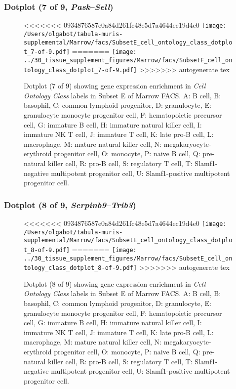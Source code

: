 \clearpage

\subsubsection{Dotplot (7 of 9, \emph{Pask}--\emph{Sell})}
\begin{figure}[h]
\centering
<<<<<<< 0934876587e0a84d261fc48e5d7a4644ec19d4e0
\texttt{[image: /Users/olgabot/tabula-muris-supplemental/Marrow/facs/SubsetE\_cell\_ontology\_class\_dotplot\_7-of-9.pdf]}
=======
\texttt{[image: ../30\_tissue\_supplement\_figures/Marrow/facs/SubsetE\_cell\_ontology\_class\_dotplot\_7-of-9.pdf]}
>>>>>>> autogenerate tex

\caption{ Dotplot (7 of 9)  showing gene expression enrichment in \emph{Cell Ontology Class} labels in Subset E of Marrow FACS. A: B cell, B: basophil, C: common lymphoid progenitor, D: granulocyte, E: granulocyte monocyte progenitor cell, F: hematopoietic precursor cell, G: immature B cell, H: immature natural killer cell, I: immature NK T cell, J: immature T cell, K: late pro-B cell, L: macrophage, M: mature natural killer cell, N: megakaryocyte-erythroid progenitor cell, O: monocyte, P: naive B cell, Q: pre-natural killer cell, R: pro-B cell, S: regulatory T cell, T: Slamf1-negative multipotent progenitor cell, U: Slamf1-positive multipotent progenitor cell.}
\end{figure}


\clearpage

\subsubsection{Dotplot (8 of 9, \emph{Serpinb9}--\emph{Trib3})}
\begin{figure}[h]
\centering
<<<<<<< 0934876587e0a84d261fc48e5d7a4644ec19d4e0
\texttt{[image: /Users/olgabot/tabula-muris-supplemental/Marrow/facs/SubsetE\_cell\_ontology\_class\_dotplot\_8-of-9.pdf]}
=======
\texttt{[image: ../30\_tissue\_supplement\_figures/Marrow/facs/SubsetE\_cell\_ontology\_class\_dotplot\_8-of-9.pdf]}
>>>>>>> autogenerate tex

\caption{ Dotplot (8 of 9)  showing gene expression enrichment in \emph{Cell Ontology Class} labels in Subset E of Marrow FACS. A: B cell, B: basophil, C: common lymphoid progenitor, D: granulocyte, E: granulocyte monocyte progenitor cell, F: hematopoietic precursor cell, G: immature B cell, H: immature natural killer cell, I: immature NK T cell, J: immature T cell, K: late pro-B cell, L: macrophage, M: mature natural killer cell, N: megakaryocyte-erythroid progenitor cell, O: monocyte, P: naive B cell, Q: pre-natural killer cell, R: pro-B cell, S: regulatory T cell, T: Slamf1-negative multipotent progenitor cell, U: Slamf1-positive multipotent progenitor cell.}
\end{figure}


